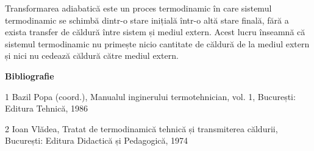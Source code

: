 \documentclass[11pt]{article}
\begin{document}
	Transformarea adiabatică este un proces termodinamic în care sistemul termodinamic se schimbă dintr-o stare inițială într-o altă stare finală, fără a exista transfer de căldură între sistem și mediul extern. Acest lucru înseamnă că sistemul termodinamic nu primește nicio cantitate de căldură de la mediul extern și nici nu cedează căldură către mediul extern.
	
	
	\textbf{Bibliografie}
	
	1 Bazil Popa (coord.), Manualul inginerului termotehnician, vol. 1, București: Editura Tehnică, 1986
	
	2 Ioan Vlădea, Tratat de termodinamică tehnică și transmiterea căldurii, București: Editura Didactică și Pedagogică, 1974
	
\end{document}
